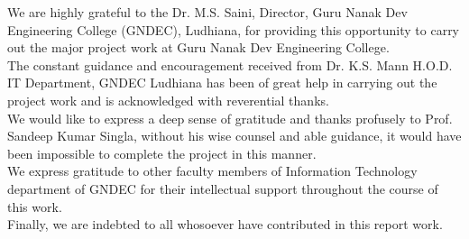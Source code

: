 \begin{Large}
\end{Large}
\vskip 0.1in %



\noindent We are highly grateful to the Dr. M.S. Saini, Director, Guru Nanak Dev Engineering College (GNDEC), Ludhiana, for providing this opportunity to carry out the major project work at Guru Nanak Dev Engineering College.\\

\noindent The constant guidance and encouragement received from Dr. K.S. Mann H.O.D. IT Department, GNDEC Ludhiana has been of great help in carrying out the project work and is acknowledged with reverential thanks.\\

\noindent We would like to express a deep sense of gratitude and thanks profusely to Prof. Sandeep Kumar Singla, without his wise counsel and able guidance, it would have been impossible to complete the project in this manner.\\

\noindent We express gratitude to other faculty members of Information Technology department of GNDEC for their intellectual support throughout the course of this work.\\

\noindent Finally, we are indebted to all whosoever have contributed in this report work.



\vskip 0.4in
\noindent 
\textbf{\studentName}

